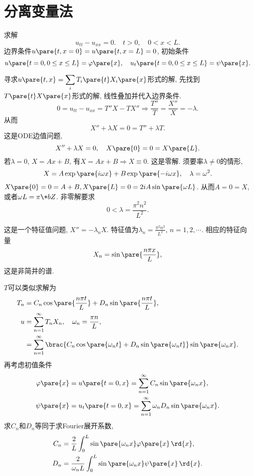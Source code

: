 \documentclass[hidelinks]{ctexart}
\begin{document}
\section{分离变量法} %
\label{sec:分离变量法}

\begin{ex}
    求解
    \[ u_{tt} - u_{xx} = 0.\quad t > 0,\quad 0 < x < L. \]
    边界条件$u\pare{t,x=0} = u\pare{t,x=L} = 0$, 初始条件
    \[ u\pare{t=0,0\le x\le L} = \varphi\pare{x},\quad u_t\pare{t=0,0\le x\le L} = \psi\pare{x}. \]
\end{ex}
寻求$u\pare{t,x} = \displaystyle \sum_i T_i\pare{t}X_i\pare{x}$形式的解, 先找到$T\pare{t}X\pare{x}$形式的解, 线性叠加并代入边界条件.
\[ 0 = u_{tt} - u_{xx} = T''X-TX''  \Rightarrow  \frac{T''}{T} = \frac{X''}{X} = -\lambda. \]
从而
\[ X'' + \lambda X = 0 = T'' + \lambda T. \]
这是ODE边值问题,
\[ X'' + \lambda X = 0,\quad X\pare{0} = 0 = X\pare{L}. \]
若$\lambda = 0$, $X = Ax+B$, 有$X = Ax+B\Rightarrow X\equiv 0$. 这是零解. 须要率$\lambda \neq 0$的情形,
\[ X = A\exp \pare{i\omega x} + B\exp\pare{-i\omega x},\quad \lambda = \omega^2. \]
$X\pare{0} = 0 = A+B, X\pare{L} = 0 = 2iA\sin\pare{\omega L}$. 从而$A=0=X$, 或者$\omega L = \pi \+bZ$. 非零解要求
\[ 0<\lambda = \frac{\pi^2n^2}{L^2}. \]
\par
这是一个特征值问题, $X'' = -\lambda_n X$. 特征值为$\displaystyle \lambda_n = \frac{\pi^2 n^2}{L^2}$, $n=1,2,\cdots$. 相应的特征向量
\[ X_n = \sin \pare{\frac{n\pi x}{L}}, \]
这是非简并的谱.
\par
$T$可以类似求解为
\begin{align*}
    T_n &= C_n \cos \pare{\frac{n\pi t}{L}} + D_n \sin\pare{\frac{n\pi t}{L}},\\
    u &= \sum_{n=1}^\infty T_nX_n,\quad \omega_n = \frac{\pi n}{L},\\
    &= \sum_{n=1}^\infty\brac{C_n \cos\pare{\omega_n t} + D_n\sin\pare{\omega_n t}} \sin\pare{\omega_n x}.
\end{align*}
再考虑初值条件
\begin{align*}
    \varphi\pare{x} &= u\pare{t=0,x} = \sum_{n=1}^\infty C_n\sin\pare{\omega_n x},\\
    \psi\pare{x} &= u_t\pare{t=0,x} = \sum_{n=1}^\infty \omega_n D_n\sin\pare{\omega_n x}.
\end{align*}
求$C_n$和$D_n$等同于求Fourier展开系数,
\begin{align*}
    C_n &= \frac{2}{L} \int_0^L \sin\pare{\omega_n x} \varphi\pare{x}\,\rd{x},\\
    D_n &= \frac{2}{\omega_n L} \int_0^L \sin\pare{\omega_n x}\psi\pare{x}\,\rd{x}.
\end{align*}
\end{document}
